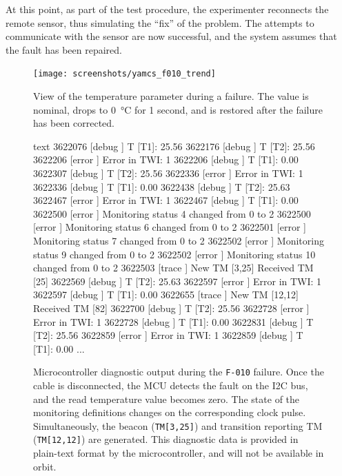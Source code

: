 \documentclass[a4paper,nobib,final]{tufte-book}
\begin{document}
At this point, as part of the test procedure, the experimenter reconnects the remote sensor, thus simulating the ``fix'' of the problem. The attempts to communicate with the sensor are now successful, and the system assumes that the fault has been repaired.
	
\begin{figure}[h]
		\centering
		\texttt{[image: screenshots/yamcs\_f010\_trend]}
		\caption[View of the temperature parameter during a failure]{View of the temperature parameter during a failure. The value is nominal, drops to \SI{0}{\celsius} for 1 second, and is restored after the failure has been corrected.}
		\label{fig:yamcsf010trend}
\end{figure}

\begin{figure}
	\begin{cminted}{text}
3622076 [debug  ] T [T1]: 25.56
3622176 [debug  ] T [T2]: 25.56
3622206 [error  ] Error in TWI: 1
3622206 [debug  ] T [T1]: 0.00
3622307 [debug  ] T [T2]: 25.56
3622336 [error  ] Error in TWI: 1
3622336 [debug  ] T [T1]: 0.00
3622438 [debug  ] T [T2]: 25.63
3622467 [error  ] Error in TWI: 1
3622467 [debug  ] T [T1]: 0.00
3622500 [error  ] Monitoring status 4 changed from 0 to 2
3622500 [error  ] Monitoring status 6 changed from 0 to 2
3622501 [error  ] Monitoring status 7 changed from 0 to 2
3622502 [error  ] Monitoring status 9 changed from 0 to 2
3622502 [error  ] Monitoring status 10 changed from 0 to 2
3622503 [trace  ] New TM [3,25]
Received TM [25]
3622569 [debug  ] T [T2]: 25.63
3622597 [error  ] Error in TWI: 1
3622597 [debug  ] T [T1]: 0.00
3622655 [trace  ] New TM [12,12]
Received TM [82]
3622700 [debug  ] T [T2]: 25.56
3622728 [error  ] Error in TWI: 1
3622728 [debug  ] T [T1]: 0.00
3622831 [debug  ] T [T2]: 25.56
3622859 [error  ] Error in TWI: 1
3622859 [debug  ] T [T1]: 0.00
...
	\end{cminted}
	\caption[Microcontroller diagnostic output during the \texttt{F-010} failure]{Microcontroller diagnostic output during the \texttt{F-010} failure. Once the cable is disconnected, the \acs{MCU} detects the fault on the \acs{I2C} bus, and the read temperature value becomes zero. The state of the monitoring definitions changes on the corresponding clock pulse. Simultaneously, the beacon (\texttt{TM[3,25]}) and transition reporting \acs{TM} (\texttt{TM[12,12]}) are generated. This diagnostic data is provided in plain-text format by the microcontroller, and will not be available in orbit.}
\end{figure}
\end{document}
